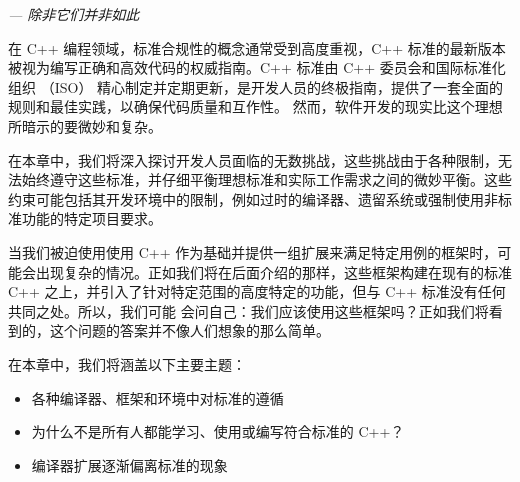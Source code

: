 
\begin{flushright}
\textit{--- 除非它们并非如此}
\end{flushright}

在 C++ 编程领域，标准合规性的概念通常受到高度重视，C++ 标准的最新版本被视为编写正确和高效代码的权威指南。C++ 标准由 C++ 委员会和国际标准化组织 （ISO） 精心制定并定期更新，是开发人员的终极指南，提供了一套全面的规则和最佳实践，以确保代码质量和互作性。 然而，软件开发的现实比这个理想所暗示的要微妙和复杂。

在本章中，我们将深入探讨开发人员面临的无数挑战，这些挑战由于各种限制，无法始终遵守这些标准，并仔细平衡理想标准和实际工作需求之间的微妙平衡。这些约束可能包括其开发环境中的限制，例如过时的编译器、遗留系统或强制使用非标准功能的特定项目要求。

当我们被迫使用使用 C++ 作为基础并提供一组扩展来满足特定用例的框架时，可能会出现复杂的情况。正如我们将在后面介绍的那样，这些框架构建在现有的标准 C++ 之上，并引入了针对特定范围的高度特定的功能，但与 C++ 标准没有任何共同之处。所以，我们可能
会问自己：我们应该使用这些框架吗？正如我们将看到的，这个问题的答案并不像人们想象的那么简单。

在本章中，我们将涵盖以下主要主题：

\begin{itemize}
\item 
各种编译器、框架和环境中对标准的遵循

\item 
为什么不是所有人都能学习、使用或编写符合标准的 C++？

\item 
编译器扩展逐渐偏离标准的现象
\end{itemize}
